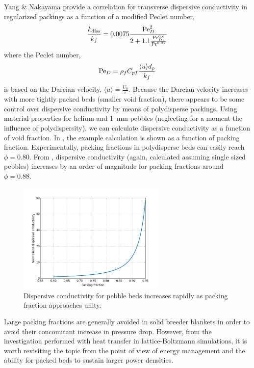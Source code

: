 Yang \& Nakayama provide a correlation for transverse dispersive conductivity in regularized packings as a function of a modified Peclet number,\cite{Yang2010a}
\begin{equation}
\frac{k_\text{diss}}{k_f} = 0.0075 \frac{\mathrm{Pe}_D^2}{2+1.1\frac{\mathrm{Pe}_D^{0.6}}{\mathrm{Pr}^{0.27}}}
\end{equation}
where the Peclet number,
\begin{equation}
\mathrm{Pe}_D = \rho_fC_{pf}\frac{\langle u \rangle d_p}{k_f}
\end{equation}
is based on the Darcian velocity, $\langle u \rangle = \frac{U_0}{\epsilon}$. Because the Darcian velocity increases with more tightly packed beds (smaller void fraction), there appears to be some control over dispersive conductivity by means of polydisperse packings. Using material properties for helium and \SI{1}{\milli\meter} pebbles (neglecting for a moment the influence of polydispersity), we can calculate dispersive conductivity as a function of void fraction. In , the example calculation is shown as a function of packing fraction. Experimentally, packing fractions in polydisperse beds can easily reach $\phi = 0.80$.\cite{Reimann:2000tw} From , dispersive conductivity (again, calculated assuming single sized pebbles) increases by an order of magnitude for packing fractions around $\phi =0.88$.

\begin{figure}[!t]
    \centering
    \includegraphics[width = 0.65\textwidth]{figures/lbm/peclet-dispersive-conductivity}
    \caption{Dispersive conductivity for pebble beds increases rapidly as packing fraction approaches unity.}\label{fig:lbm-dis-peclet}
\end{figure}

Large packing fractions are generally avoided in solid breeder blankets in order to avoid their concomitant increase in pressure drop. However, from the investigation performed with heat transfer in lattice-Boltzmann simulations, it is worth revisiting the topic from the point of view of energy management and the ability for packed beds to sustain larger power densities.

